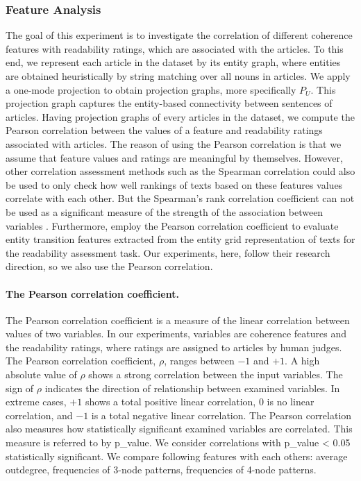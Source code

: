 \subsubsection{Feature Analysis}
The goal of this experiment is to investigate the correlation of different coherence features with  readability ratings, which are associated with the articles. 
To this end, we represent each article in the dataset by its entity graph, where entities are obtained heuristically by string matching over all nouns in articles. 
We apply a one-mode projection to obtain projection graphs, more specifically $P_U$. 
This projection graph captures the entity-based connectivity between sentences of articles. 
Having projection graphs of every articles in the dataset, we compute the Pearson correlation between the values of a feature and readability ratings associated with articles. 
The reason of using the Pearson correlation is that we assume that feature values and ratings are meaningful by themselves. 
However, other correlation assessment methods such as the Spearman correlation could also be used to only check how well rankings of texts based on these features values correlate with each other. 
But the Spearman's rank correlation coefficient can not be used as a significant measure of the strength of the association between variables \cite{hauke11}.
Furthermore,  employ the Pearson correlation coefficient to evaluate entity transition features extracted from the entity grid representation \cite{barzilay08} of texts for the readability assessment task. 
Our experiments, here, follow their research direction, so we also use the Pearson correlation. 

\paragraph{The Pearson correlation coefficient.} 
The Pearson correlation coefficient is a measure of the linear correlation between values of two variables. 
In our experiments, variables are coherence features and the readability ratings, where ratings are assigned to articles by human judges.  
The Pearson correlation coefficient, $\rho$, ranges between $-1$ and $+1$. 
A high absolute value of $\rho$ shows a strong correlation between the input variables. 
The sign of $\rho$ indicates the direction of relationship between examined variables. 
In extreme cases, $+1$ shows a total positive linear correlation, $0$ is no linear correlation, and $-1$ is a total negative linear correlation. 
The Pearson correlation also measures how statistically significant examined variables are correlated. 
This measure is referred to by p\_value. 
We consider correlations with p\_value < 0.05 statistically significant. 
We compare following features with each others: average outdegree, frequencies of 3-node patterns, frequencies of 4-node patterns. 

